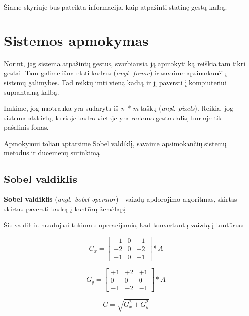 \documentclass{VUMIFInfKursinis}
\begin{document}
Šiame skyriuje bus pateikta informacija, kaip atpažinti statinę gestų kalbą.

\section{Sistemos apmokymas}
Norint, jog sistema atpažintų gestus, svarbiausia ją apmokyti ką reiškia tam tikri gestai. Tam galime išnaudoti kadrus (\textit{angl. frame}) ir savaime apsimokančių sistemų galimybes. Tad reiktų imti vieną kadrą ir jį paversti į kompiuteriui suprantamą kalbą. 

Imkime, jog nuotrauka yra sudaryta iš \textit{n * m} taškų (\textit{angl. pixels}). Reikia, jog sistema atskirtų, kurioje kadro vietoje yra rodomo gesto dalis, kurioje tik pašalinis fonas.

Apmokymui toliau aptarsime Sobel valdiklį, savaime apsimokančių sistemų metodus ir duoemenų surinkimą 

\subsection{Sobel valdiklis}
\textbf{Sobel valdiklis} (\textit{angl. Sobel operator}) - vaizdų apdorojimo algoritmas, skirtas skirtas paversti kadrą į kontūrų žemėlapį.

Šis valdiklis naudojasi tokiomis operacijomis, kad konvertuotų vaizdą į kontūrus:

\begin{equation}\label{eq:sobelgx}
	G_x = 
	\begin{bmatrix}
	+1 & 0 & -1 \\
	+2 & 0 & -2 \\
	+1 & 0 & -1
	\end{bmatrix} * A
\end{equation}
	
\begin{equation}\label{eq:sobelgy}
	G_y = 
	\begin{bmatrix}
	+1 & +2 & +1 \\
	0 & 0 & 0 \\
	-1 & -2 & -1
	\end{bmatrix} * A
\end{equation}

\begin{equation}\label{eq:sobelg}
G = \sqrt{G_x^2 + G_y^2}
\end{equation}
\end{document}

